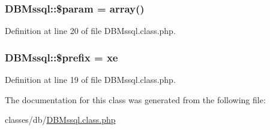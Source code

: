 \subsubsection[{\$param}]{\setlength{\rightskip}{0pt plus 5cm}D\+B\+Mssql\+::\$param = array()}\label{classDBMssql_a352ee40852cea6dc20de096486603805}


Definition at line 20 of file D\+B\+Mssql.\+class.\+php.

\hypertarget{classDBMssql_a733cd192b424b5a66ea14e3e62391844}{}
\subsubsection[{\$prefix}]{\setlength{\rightskip}{0pt plus 5cm}D\+B\+Mssql\+::\$prefix = \textquotesingle{}xe\textquotesingle{}}\label{classDBMssql_a733cd192b424b5a66ea14e3e62391844}


Definition at line 19 of file D\+B\+Mssql.\+class.\+php.



The documentation for this class was generated from the following file\+:\begin{DoxyCompactItemize}
\item 
classes/db/\hyperlink{DBMssql_8class_8php}{D\+B\+Mssql.\+class.\+php}\end{DoxyCompactItemize}
